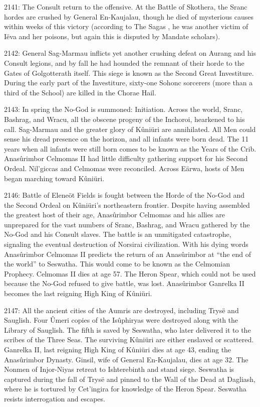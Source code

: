 \documentclass[]{book}
\begin{document}
2141: The Consult return to the offensive. At the Battle of Skothera, the Sranc hordes
are crushed by General En-Kaujalau, though he died of mysterious causes
within weeks of this victory (according to The Sagas , he was another victim of
Iëva and her poisons, but again this is disputed by Mandate scholars).

2142: General Sag-Marmau inflicts yet another crushing defeat on Aurang and his
Consult legions, and by fall he had hounded the remnant of their horde to the
Gates of Golgotterath itself. This siege is known as the Second Great
Investiture. During the early part of the Investiture, sixty-one Sohonc sorcerers
(more than a third of the School) are killed in the Chorae Hail.

2143: In spring the No-God is summoned: Initiation. Across the world, Sranc,
Bashrag, and Wracu, all the obscene progeny of the Inchoroi, hearkened to his
call. Sag-Marmau and the greater glory of Kûniüri are annihilated. All Men
could sense his dread presence on the horizon, and all infants were born dead.
The 11 years when all infants were still born comes to be known as the Years of
the Crib. Anasûrimbor Celmomas II had little difficulty gathering support for
his Second Ordeal. Nil'giccas and Celmomas were reconciled. Across Eärwa,
hosts of Men began marching toward Kûniüri.

2146: Battle of Eleneöt Fields is fought between the Horde of the No-God and the
Second Ordeal on Kûniüri's northeastern frontier. Despite having assembled
the greatest host of their age, Anasûrimbor Celmomas and his allies are
unprepared for the vast numbers of Sranc, Bashrag, and Wracu gathered by the
No-God and his Consult slaves. The battle is an unmitigated catastrophe,
signaling the eventual destruction of Norsirai civilization. With his dying words
Anasûrimbor Celmomas II predicts the return of an Anasûrimbor at ``the end
of the world'' to Seswatha. This would come to be known as the Celmomian
Prophecy. Celmomas II dies at age 57. The Heron Spear, which could not be
used because the No-God refused to give battle, was lost. Anasûrimbor
Ganrelka II becomes the last reigning High King of Kûniüri.

2147: All the ancient cities of the Aumris are destroyed, including Trysë and
Sauglish. Four Ûmeri copies of the Isûphiryas were destroyed along with the
Library of Sauglish. The fifth is saved by Seswatha, who later delivered it to the
scribes of the Three Seas. The surviving Kûniüri are either enslaved or scattered. Ganrelka II, last reigning High King of Kûniüri dies at age 43, ending
the Anasûrimbor Dynasty. Ginsil, wife of General En-Kaujalau, dies at age
32. The Nonmen of Injor-Niyas retreat to Ishterebinth and stand siege.
Seswatha is captured during the fall of Trysë and pinned to the Wall of the
Dead at Dagliash, where he is tortured by Cet'ingira for knowledge of the
Heron Spear. Seswatha resists interrogation and escapes.
\end{document}
